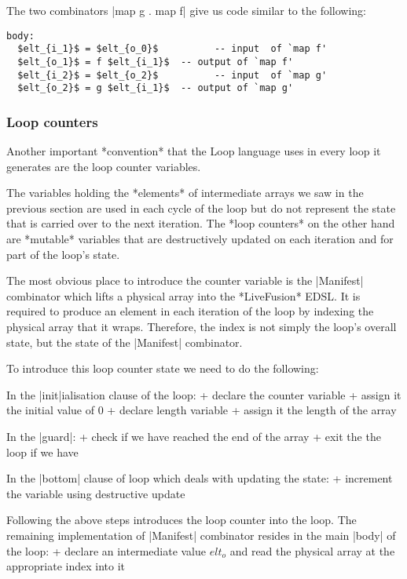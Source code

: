 The two combinators |map g . map f| give us code similar to the following:

\begin{lstlisting}[mathescape]
body:
  $elt_{i_1}$ = $elt_{o_0}$          -- input  of `map f'
  $elt_{o_1}$ = f $elt_{i_1}$  -- output of `map f'
  $elt_{i_2}$ = $elt_{o_2}$          -- input  of `map g'
  $elt_{o_2}$ = g $elt_{i_1}$  -- output of `map g'
\end{lstlisting}

\subsubsection{Loop counters}

Another important *convention* that the Loop language uses in every loop it generates are the loop counter variables.

The variables holding the *elements* of intermediate arrays we saw in the previous section are used in each cycle of the loop but do not represent the state that is carried over to the next iteration. The *loop counters* on the other hand are *mutable* variables that are destructively updated on each iteration and for part of the loop's state.

The most obvious place to introduce the counter variable is the |Manifest| combinator which lifts a physical array into the *LiveFusion* EDSL. It is required to produce an element in each iteration of the loop by indexing the physical array that it wraps. Therefore, the index is not simply the loop's overall state, but the state of the |Manifest| combinator.

To introduce this loop counter state we need to do the following:

In the |init|ialisation clause of the loop:
+ declare the counter variable
+ assign it the initial value of 0
+ declare length variable
+ assign it the length of the array

In the |guard|:
+ check if we have reached the end of the array
+ exit the the loop if we have

In the |bottom| clause of loop which deals with updating the state:
+ increment the variable using destructive update

Following the above steps introduces the loop counter into the loop. The remaining implementation of |Manifest| combinator resides in the main |body| of the loop:
+ declare an intermediate value $elt_o$ and read the physical array at the appropriate index into it

